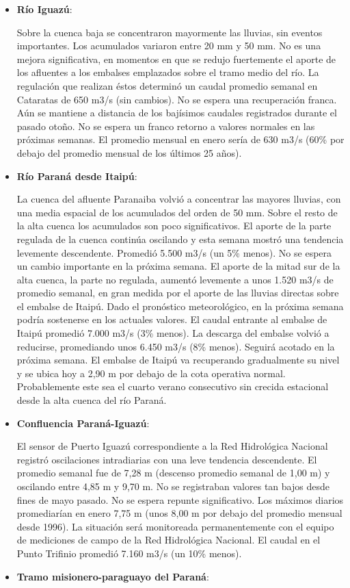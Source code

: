 \begin{itemize}
\tightlist
\item
  \textbf{Río Iguazú}:

  Sobre la cuenca baja se concentraron mayormente las lluvias, sin
  eventos importantes. Los acumulados variaron entre 20 mm y 50 mm. No
  es una mejora significativa, en momentos en que se redujo fuertemente
  el aporte de los afluentes a los embalses emplazados sobre el tramo
  medio del río. La regulación que realizan éstos determinó un caudal
  promedio semanal en Cataratas de 650 m3/s (sin cambios). No se espera
  una recuperación franca. Aún se mantiene a distancia de los bajísimos
  caudales registrados durante el pasado otoño. No se espera un franco
  retorno a valores normales en las próximas semanas. El promedio
  mensual en enero sería de 630 m3/s (60\% por debajo del promedio
  mensual de los últimos 25 años).
\item
  \textbf{Río Paraná desde Itaipú}:

  La cuenca del afluente Paranaiba volvió a concentrar las mayores
  lluvias, con una media espacial de los acumulados del orden de 50 mm.
  Sobre el resto de la alta cuenca los acumulados son poco
  significativos. El aporte de la parte regulada de la cuenca continúa
  oscilando y esta semana mostró una tendencia levemente descendente.
  Promedió 5.500 m3/s (un 5\% menos). No se espera un cambio importante
  en la próxima semana. El aporte de la mitad sur de la alta cuenca, la
  parte no regulada, aumentó levemente a unos 1.520 m3/s de promedio
  semanal, en gran medida por el aporte de las lluvias directas sobre el
  embalse de Itaipú. Dado el pronóstico meteorológico, en la próxima
  semana podría sostenerse en los actuales valores. El caudal entrante
  al embalse de Itaipú promedió 7.000 m3/s (3\% menos). La descarga del
  embalse volvió a reducirse, promediando unos 6.450 m3/s (8\% menos).
  Seguirá acotado en la próxima semana. El embalse de Itaipú va
  recuperando gradualmente su nivel y se ubica hoy a 2,90 m por debajo
  de la cota operativa normal. Probablemente este sea el cuarto verano
  consecutivo sin crecida estacional desde la alta cuenca del río
  Paraná.
\item
  \textbf{Confluencia Paraná-Iguazú}:

  El sensor de Puerto Iguazú correspondiente a la Red Hidrológica
  Nacional registró oscilaciones intradiarias con una leve tendencia
  descendente. El promedio semanal fue de 7,28 m (descenso promedio
  semanal de 1,00 m) y oscilando entre 4,85 m y 9,70 m. No se
  registraban valores tan bajos desde fines de mayo pasado. No se espera
  repunte significativo. Los máximos diarios promediarían en enero 7,75
  m (unos 8,00 m por debajo del promedio mensual desde 1996). La
  situación será monitoreada permanentemente con el equipo de mediciones
  de campo de la Red Hidrológica Nacional. El caudal en el Punto
  Trifinio promedió 7.160 m3/s (un 10\% menos).
\item
  \textbf{Tramo misionero-paraguayo del Paraná}:


\end{itemize}
